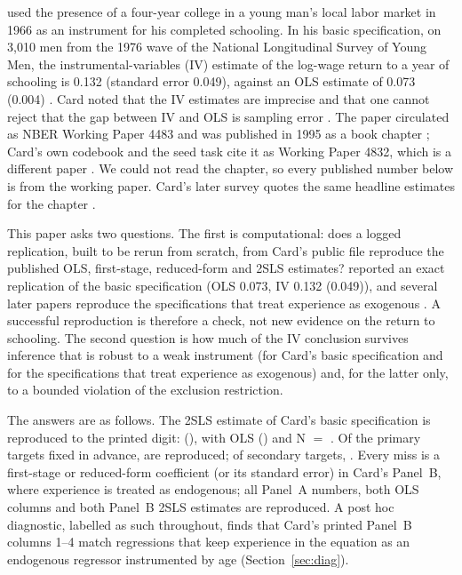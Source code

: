 \documentclass[11pt]{article}
\begin{document}
\citet{card1993nber} used the presence of a four-year college in a young man's local labor
market in 1966 as an instrument for his completed schooling. In his basic specification,
on 3,010 men from the 1976 wave of the National Longitudinal Survey of Young Men, the %
instrumental-variables (IV) estimate of the log-wage return to a year of schooling is 0.132 %
(standard error 0.049), against an OLS estimate of 0.073 (0.004) %
\citep[Table~3 Panel~B column~6; Table~2 column~5]{card1993nber}. Card noted that the IV
estimates are imprecise and that one cannot reject that the gap between IV and OLS is
sampling error \citep[p.~13]{card1993nber}. The paper circulated as NBER Working Paper 4483
and was published in 1995 as a book chapter \citep{card2000estimating}; Card's own codebook
and the seed task cite it as Working Paper 4832, which is a different paper
\citep{card1994earnings}. We could not read the chapter, so every published number below
is from the working paper. Card's later survey quotes the same headline estimates for the
chapter \citep{card2000estimating}.

This paper asks two questions. The first is computational: does a logged replication, built to be rerun from scratch, from Card's public file \citep{cardproximitydata} reproduce the published OLS,
first-stage, reduced-form and 2SLS estimates? \citet{kling2001interpreting} reported an
exact replication of the basic specification (OLS 0.073, IV 0.132 (0.049)), and several %
later papers reproduce the specifications that treat experience as exogenous
\citep{bi2020inferring,blandhol2025tsls,delbianco2026testing}. A successful reproduction is
therefore a check, not new evidence on the return to schooling. The second question is
how much of the IV conclusion survives inference that is robust to a weak instrument (for
Card's basic specification and for the specifications that treat experience as exogenous)
and, for the latter only, to a bounded violation of the exclusion restriction.

The answers are as follows. The 2SLS estimate of Card's basic specification is reproduced
to the printed digit: \IvReturn{} (\IvReturnSe{}), with OLS \OlsReturn{}
(\OlsReturnSe{}) and N $=$ \NSample{}. Of the \HOnePrimaryTargets{} primary targets fixed
in advance, \HOnePrimaryReproduced{} are reproduced; of \HOneSecondaryTargets{} secondary
targets, \HOneSecondaryReproduced{}. Every miss is a first-stage or reduced-form coefficient (or its
standard error) in Card's Panel~B, where experience is treated as endogenous; all
Panel~A numbers, both OLS columns and both Panel~B 2SLS estimates are reproduced. A post
hoc diagnostic, labelled as such throughout, finds that Card's printed Panel~B columns 1--4
match regressions that keep experience in the equation as an endogenous regressor
instrumented by age (Section~\ref{sec:diag}).
\end{document}
